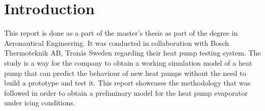 \documentclass[11pt,a4paper,twoside,oneside]{article}
\begin{document}


\cleardoublepage

\thispagestyle{plain}

\tableofcontents
\listoffigures
\listoftables



\cleardoublepage

\thispagestyle{plain}

\onehalfspacing
\section{Introduction}
\vspace{.6cm}

This {report} is done as a part of the master's thesis as part of the degree in Aeronautical Engineering. It was conducted in collaboration with Bosch Thermoteknik AB, Tran\aa s Sweden regarding their heat pump testing system. The study is a way for the company to obtain a working simulation model of a heat pump that can predict the behaviour of new heat pumps without the need to build a prototype and test it. This report showcases the methodology that was followed in order to obtain a preliminary model for the heat pump {evaporator} under icing conditions.
\end{document}
